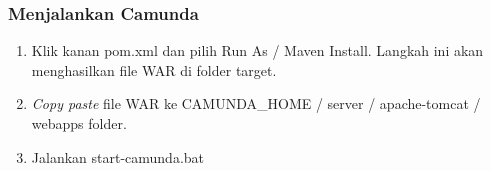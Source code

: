 \subsubsection{Menjalankan Camunda}
\label{menjalankancamunda}
	\begin{enumerate}
		\item Klik kanan pom.xml dan pilih Run As / Maven Install. Langkah ini akan menghasilkan file WAR di folder target.
		\item \textit{Copy paste} file WAR ke CAMUNDA\_HOME / server / apache-tomcat / webapps folder.
		\item Jalankan start-camunda.bat
	\end{enumerate}